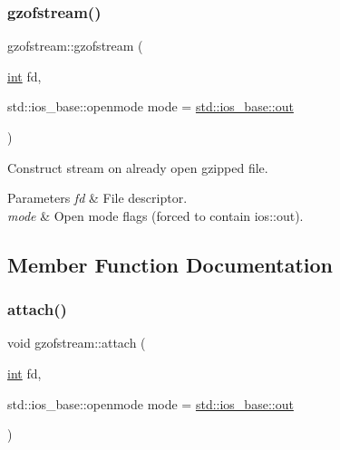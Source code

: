 \subsubsection{\texorpdfstring{gzofstream()}{gzofstream()}\hspace{0.1cm}{\footnotesize\ttfamily [6/6]}}
{\footnotesize\ttfamily gzofstream\+::gzofstream (\begin{DoxyParamCaption}\item[{\mbox{\hyperlink{ioapi_8h_a787fa3cf048117ba7123753c1e74fcd6}{int}}}]{fd,  }\item[{std\+::ios\+\_\+base\+::openmode}]{mode = {\ttfamily \mbox{\hyperlink{gun_8c_acb2d4658684492100bc328998f52ae82}{std\+::ios\+\_\+base\+::out}}} }\end{DoxyParamCaption})\hspace{0.3cm}{\ttfamily [explicit]}}



Construct stream on already open gzipped file. 


\begin{DoxyParams}{Parameters}
{\em fd} & File descriptor. \\
\hline
{\em mode} & Open mode flags (forced to contain ios\+::out). \\
\hline
\end{DoxyParams}


\subsection{Member Function Documentation}
\mbox{\label{classgzofstream_a95b76eaecd03b6cbf53d2f4b1c867439}} 
\subsubsection{\texorpdfstring{attach()}{attach()}}
{\footnotesize\ttfamily void gzofstream\+::attach (\begin{DoxyParamCaption}\item[{\mbox{\hyperlink{ioapi_8h_a787fa3cf048117ba7123753c1e74fcd6}{int}}}]{fd,  }\item[{std\+::ios\+\_\+base\+::openmode}]{mode = {\ttfamily \mbox{\hyperlink{gun_8c_acb2d4658684492100bc328998f52ae82}{std\+::ios\+\_\+base\+::out}}} }\end{DoxyParamCaption})}



